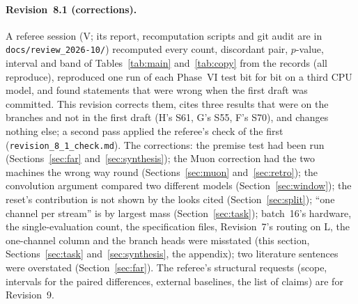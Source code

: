 \documentclass[11pt]{article}
\begin{document}
\paragraph{Revision~8.1 (corrections).} A referee session (V; its report, recomputation scripts and git audit are in \texttt{docs/review\_2026-10/}) recomputed every count, discordant pair, $p$-value, interval and band of Tables~\ref{tab:main} and~\ref{tab:copy} from the records (all reproduce), reproduced one run of each Phase~VI test bit for bit on a third CPU model, and found statements that were wrong when the first draft was committed. This revision corrects them, cites three results that were on the branches and not in the first draft (H's S61, G's S55, F's S70), and changes nothing else; a second pass applied the referee's check of the first (\texttt{revision\_8\_1\_check.md}). The corrections: the premise test had been run (Sections~\ref{sec:far} and~\ref{sec:synthesis}); the Muon correction had the two machines the wrong way round (Sections~\ref{sec:muon} and~\ref{sec:retro}); the convolution argument compared two different models (Section~\ref{sec:window}); the reset's contribution is not shown by the looks cited (Section~\ref{sec:split}); ``one channel per stream'' is by largest mass (Section~\ref{sec:task}); batch~16's hardware, the single-evaluation count, the specification files, Revision~7's routing on L, the one-channel column and the branch heads were misstated (this section, Sections~\ref{sec:task} and~\ref{sec:synthesis}, the appendix); two literature sentences were overstated (Section~\ref{sec:far}). The referee's structural requests (scope, intervals for the paired differences, external baselines, the list of claims) are for Revision~9.
\end{document}
